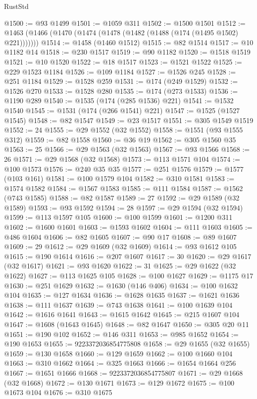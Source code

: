 \begin{lexlean}{RustStd}
\begin{coremodule}
@1500 := @93 @1499
@1501 := @1059 @311
@1502 := @1500 @1501
@1512 := @1463 (@1466 (@1470 (@1474 (@1478 (@1482 (@1488 (@174 (@1495 @1502) @221)))))))
@1514 := @1458 (@1460 @1512)
@1515 := @82 @1514
@1517 := @10 @1182 @14
@1518 := @230 @1517
@1519 := @90 @1182
@1520 := @1518 @1519
@1521 := @10 @1520
@1522 := @18 @1517
@1523 := @1521 @1522
@1525 := @229 @1523 @1184
@1526 := @109 @1184
@1527 := @1526 @245
@1528 := @251 @1184
@1529 := @1528 @259
@1531 := @174 (@249 @1529)
@1532 := @1526 @270
@1533 := @1528 @280
@1535 := @174 (@273 @1533)
@1536 := @1190 @289
@1540 := @1535 (@174 (@285 @1536) @221)
@1541 := @1532 @1540
@1545 := @1531 (@174 (@266 @1541) @221)
@1547 := @1525 (@1527 @1545)
@1548 := @82 @1547
@1549 := @23 @1517
@1551 := @305 @1549 @1519
@1552 := 24
@1555 := @29 @1552 (@32 @1552)
@1558 := @1551 (@93 @1555 @312)
@1559 := @82 @1558
@1560 := @36 @19
@1562 := @305 @1560 @35
@1563 := 25
@1566 := @29 @1563 (@32 @1563)
@1567 := @93 @1566
@1568 := 26
@1571 := @29 @1568 (@32 @1568)
@1573 := @113 @1571 @104
@1574 := @100 @1573
@1576 := @240 @35 @35
@1577 := @251 @1576
@1579 := @1577 (@103 @161)
@1581 := @100 @1579 @104
@1582 := @310 @1581
@1583 := @1574 @1582
@1584 := @1567 @1583
@1585 := @111 @1584
@1587 := @1562 (@743 @1585)
@1588 := @82 @1587
@1589 := 27
@1592 := @29 @1589 (@32 @1589)
@1593 := @93 @1592
@1594 := 28
@1597 := @29 @1594 (@32 @1594)
@1599 := @113 @1597 @105
@1600 := @100 @1599
@1601 := @1200 @311
@1602 := @1600 @1601
@1603 := @1593 @1602
@1604 := @111 @1603
@1605 := @486 @1604
@1606 := @82 @1605
@1607 := @90 @17
@1608 := @89 @1607
@1609 := 29
@1612 := @29 @1609 (@32 @1609)
@1614 := @93 @1612 @105
@1615 := @190 @1614
@1616 := @207 @1607
@1617 := 30
@1620 := @29 @1617 (@32 @1617)
@1621 := @93 @1620
@1622 := 31
@1625 := @29 @1622 (@32 @1622)
@1627 := @113 @1625 @105
@1628 := @100 @1627
@1629 := @1175 @17
@1630 := @251 @1629
@1632 := @1630 (@146 @406)
@1634 := @100 @1632 @104
@1635 := @127 @1634
@1636 := @1628 @1635
@1637 := @1621 @1636
@1638 := @111 @1637
@1639 := @743 @1638
@1641 := @100 @1639 @104
@1642 := @1616 @1641
@1643 := @1615 @1642
@1645 := @215 @1607 @104
@1647 := @1608 (@1643 @1645)
@1648 := @82 @1647
@1650 := @305 @20 @11
@1651 := @190 @102
@1652 := @146 @311
@1653 := @985 @1652
@1654 := @190 @1653
@1655 := 9223372036854775808
@1658 := @29 @1655 (@32 @1655)
@1659 := @130 @1658
@1660 := @129 @1659
@1662 := @100 @1660 @104
@1663 := @310 @1662
@1664 := @325 @1663
@1666 := @1654 @1664 @256
@1667 := @1651 @1666
@1668 := 9223372036854775807
@1671 := @29 @1668 (@32 @1668)
@1672 := @130 @1671
@1673 := @129 @1672
@1675 := @100 @1673 @104
@1676 := @310 @1675

\end{coremodule}
\end{lexlean}
